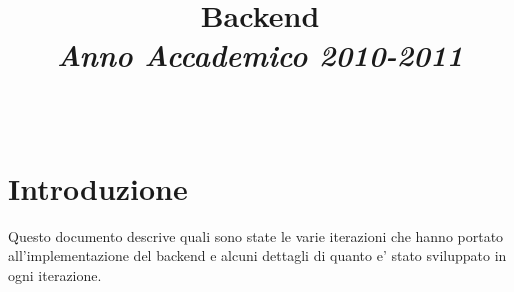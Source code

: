 \documentclass[10pt]{article}
\title{Backend\\[2mm]{\small\emph{Anno Accademico 2010-2011}}\\[4mm]}
\author{\Nome\ \Cognome}
\begin{document}
\maketitle

\tableofcontents

\section{Introduzione}
Questo documento descrive quali sono state le varie iterazioni che hanno portato all'implementazione del backend e alcuni dettagli di quanto e' stato sviluppato in ogni iterazione.



\printindex
\end{document}

